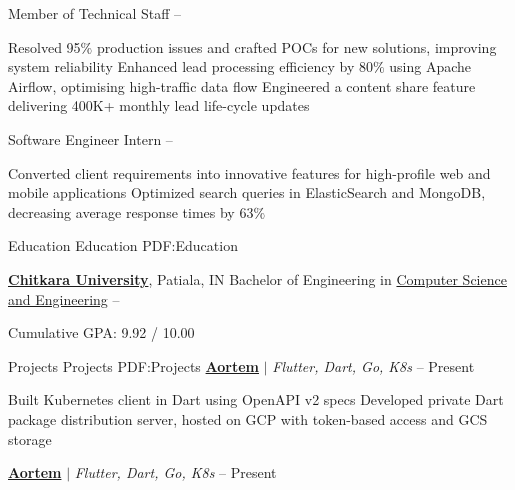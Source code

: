 \documentclass[letterpaper,MMMyyyy,nonstopmode]{simpleresumecv}
\begin{document}
\begin{Body}
\BigGap

Member of Technical Staff
\hfill
{} -- 
\begin{Detail}
\Gap
\BulletItem
Resolved 95$\%$ production issues and crafted POCs for new solutions, improving system reliability
\Gap
\BulletItem
Enhanced lead processing efficiency by 80$\%$ using Apache Airflow, optimising high-traffic data flow
Engineered a content share feature delivering 400K+ monthly lead life-cycle updates
\end{Detail}

\BigGap

Software Engineer Intern
\hfill
{} -- 
\begin{Detail}
\Gap
\BulletItem
Converted client requirements into innovative features for high-profile web and mobile applications
\Gap
\BulletItem
Optimized search queries in ElasticSearch and MongoDB, decreasing average response times by 63$\%$
\end{Detail}



\Section
{Education}
{Education}
{PDF:Education}

\Entry
\href{https://www.chitkara.edu.in/engineering/colleges-punjab-chandigarh}
{\textbf{Chitkara University}},
\hfill Patiala, IN
\Gap
Bachelor of Engineering in
\href{https://www.chitkara.edu.in/cse/}
{Computer Science and Engineering}
\hfill
{} --
\Gap
\begin{Detail}
Cumulative GPA: 9.92 / 10.00
\end{Detail}



\Section
{Projects}
{Projects}
{PDF:Projects}
\Entry
\href{https://aortem.io}
{\textbf{Aortem}}
$|$ \emph{Flutter, Dart, Go, K8s}
\hfill
{} -- Present

\begin{Detail}
\Gap
\BulletItem
Built Kubernetes client in Dart using OpenAPI v2 specs
\BulletItem
Developed private Dart package distribution server, hosted on GCP with token-based access and GCS storage
\end{Detail}

\BigGap

\Entry
\href{https://aortem.io}
{\textbf{Aortem}}
$|$ \emph{Flutter, Dart, Go, K8s}
\hfill
{} -- Present


\end{Body}
\end{document}
